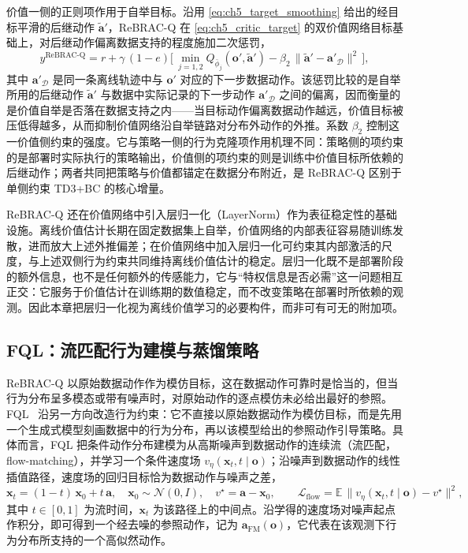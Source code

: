 价值一侧的正则项作用于自举目标。沿用 \eqref{eq:ch5_target_smoothing} 给出的经目标平滑的后继动作 $\tilde{\mathbf{a}}'$，ReBRAC-Q 在 \eqref{eq:ch5_critic_target} 的双价值网络目标基础上，对后继动作偏离数据支持的程度施加二次惩罚，
\begin{equation}
y^{\mathrm{ReBRAC\text{-}Q}}
= r + \gamma\,(1-e)\Big[\,
\min_{j=1,2} Q_{\bar\phi_j}(\mathbf{o}',\tilde{\mathbf{a}}')
- \beta_2\,\big\|\tilde{\mathbf{a}}' - \mathbf{a}'_{\mathcal D}\big\|^2
\,\Big],
\label{eq:ch5_rebrac_target}
\end{equation}
其中 $\mathbf{a}'_{\mathcal D}$ 是同一条离线轨迹中与 $\mathbf{o}'$ 对应的下一步数据动作。该惩罚比较的是自举所用的后继动作 $\tilde{\mathbf{a}}'$ 与数据中实际记录的下一步动作 $\mathbf{a}'_{\mathcal D}$ 之间的偏离，因而衡量的是价值自举是否落在数据支持之内——当目标动作偏离数据动作越远，价值目标被压低得越多，从而抑制价值网络沿自举链路对分布外动作的外推。系数 $\beta_2$ 控制这一价值侧约束的强度。它与策略一侧的行为克隆项作用机理不同：策略侧的项约束的是部署时实际执行的策略输出，价值侧的项约束的则是训练中价值目标所依赖的后继动作；两者共同把策略与价值都锚定在数据分布附近，是 ReBRAC-Q 区别于单侧约束 TD3+BC 的核心增量。

ReBRAC-Q 还在价值网络中引入层归一化（LayerNorm）作为表征稳定性的基础设施。离线价值估计长期在固定数据集上自举，价值网络的内部表征容易随训练发散，进而放大上述外推偏差；在价值网络中加入层归一化可约束其内部激活的尺度，与上述双侧行为约束共同维持离线价值估计的稳定。层归一化既不是部署阶段的额外信息，也不是任何额外的传感能力，它与“特权信息是否必需”这一问题相互正交：它服务于价值估计在训练期的数值稳定，而不改变策略在部署时所依赖的观测。因此本章把层归一化视为离线价值学习的必要构件，而非可有可无的附加项。

\subsection{FQL：流匹配行为建模与蒸馏策略}\label{subsec:ch5_method_fql}

ReBRAC-Q 以原始数据动作作为模仿目标，这在数据动作可靠时是恰当的，但当行为分布呈多模态或带有噪声时，对原始动作的逐点模仿未必给出最好的参照。FQL~\citep{park2025fql} 沿另一方向改造行为约束：它不直接以原始数据动作为模仿目标，而是先用一个生成式模型刻画数据中的行为分布，再以该模型给出的参照动作引导策略。具体而言，FQL 把条件动作分布建模为从高斯噪声到数据动作的连续流（流匹配，flow-matching），并学习一个条件速度场 $v_\eta(\mathbf{x}_t,t\mid\mathbf{o})$；沿噪声到数据动作的线性插值路径，速度场的回归目标恰为数据动作与噪声之差，
\begin{equation}
\mathbf{x}_t = (1-t)\,\mathbf{x}_0 + t\,\mathbf{a},
\quad \mathbf{x}_0 \sim \mathcal{N}(0,I),
\quad v^\star = \mathbf{a} - \mathbf{x}_0,
\qquad
\mathcal{L}_{\mathrm{flow}}
= \mathbb{E}\,\big\|v_\eta(\mathbf{x}_t,t\mid\mathbf{o}) - v^\star\big\|^2,
\label{eq:ch5_fql_flow}
\end{equation}
其中 $t\in[0,1]$ 为流时间，$\mathbf{x}_t$ 为该路径上的中间点。沿学得的速度场对噪声起点作积分，即可得到一个经去噪的参照动作，记为 $\mathbf{a}_{\mathrm{FM}}(\mathbf{o})$，它代表在该观测下行为分布所支持的一个高似然动作。

